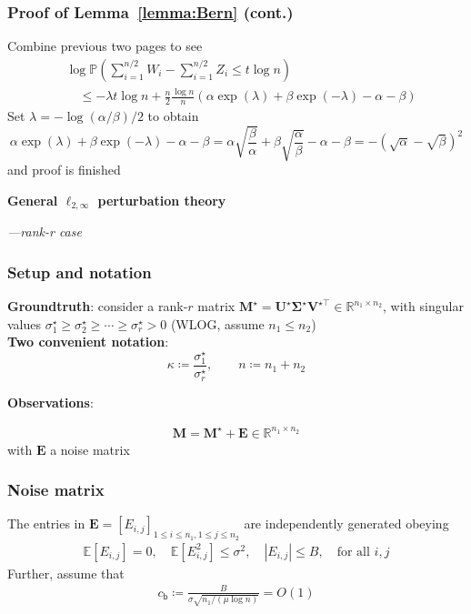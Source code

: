 \documentclass[compress,
mathserif,wide,%
]{beamer}
\begin{document}
\begin{frame}
	\frametitle{Proof of Lemma~\ref{lemma:Bern} (cont.)}
	Combine previous two pages to see
\begin{align*}
& \log\mathbb{P}\left(\sum_{i=1}^{n/2}W_{i}-\sum_{i=1}^{n/2}Z_{i}\leq t\log n\right) \\
&\quad \leq-\lambda t\log n+\frac{n}{2}\frac{\log n}{n}\left(\alpha\exp\left(\lambda\right)+\beta\exp\left(-\lambda\right)-\alpha-\beta\right)
\end{align*}
Set $\lambda=-\log\left(\alpha/\beta\right)/2$ to obtain 
\[
\alpha\exp\left(\lambda\right)+\beta\exp\left(-\lambda\right)-\alpha-\beta=\alpha\sqrt{\frac{\beta}{\alpha}}+\beta\sqrt{\frac{\alpha}{\beta}}-\alpha-\beta=-\left(\sqrt{\alpha}-\sqrt{\beta}\right)^{2}
\]
and proof is finished 

\end{frame}


\begin{frame}[plain]
\vfill
\centering
{\large \bf General $\ell_{2,\infty}$ perturbation theory}

{\hfill \em ---rank-r case}
\vfill
\end{frame}



\begin{frame}
	\frametitle{Setup and notation}
	{\bf Groundtruth}: consider a rank-$r$ matrix $\bm{M}^{\star} = \bm{U}^{\star}\bm{\Sigma}^{\star}\bm{V}^{\star\top} \in\mathbb{R}^{n_{1}\times n_{2}}$, with singular values $\sigma_{1}^{\star}\geq \sigma_{2}^{\star} \geq \cdots \geq \sigma_{r}^{\star} > 0$ (WLOG, assume $n_1 \leq n_2$)  \\
	
	\vspace{1em}
	{\bf Two convenient notation}:
	\[
	\kappa \coloneqq \frac{\sigma_{1}^{\star}}{\sigma_{r}^{\star}}, \qquad n \coloneqq n_1 + n_2 
	\] 
	
	\vspace{1em}
	{\bf Observations}: 
	
	\begin{align*}
	\bm{M}=\bm{M}^{\star}+\bm{E} \in \mathbb{R}^{n_1 \times n_2}
\end{align*}
with $\bm{E}$ a  noise matrix
\end{frame}


\begin{frame}
	\frametitle{Noise matrix}


	The entries in $\bm{E}=[E_{i,j}]_{1 \leq i \leq n_1, 1 \leq j \leq n_2}$ are independently generated obeying
%
\begin{align*}
	\mathbb{E}[E_{i,j}] = 0, \quad \mathbb{E}[E_{i,j}^2]\leq \sigma^2, \quad |E_{i,j}|\leq B, \quad \text{for all }i, j
\end{align*}
%
	Further,  assume that 
	\begin{align*}
		c_{\mathsf{b}} \coloneqq \frac{B}{  \sigma  \sqrt{n_1/(\mu\log n)} } = O(1)
	\end{align*}
	
\end{frame}
\end{document}
